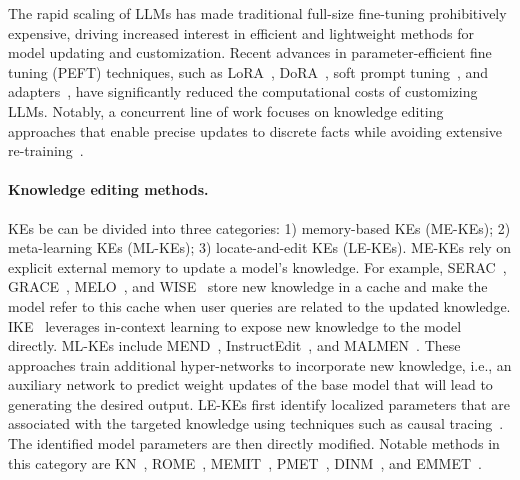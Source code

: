 

The rapid scaling of LLMs has made traditional full-size fine-tuning prohibitively expensive, driving increased interest in efficient and lightweight methods for model updating and customization. Recent advances in parameter-efficient fine tuning (PEFT) techniques, such as LoRA~\cite{hu2022lora}, DoRA~\cite{liudora}, soft prompt tuning~\cite{lester-etal-2021-power,razdaibiedina-etal-2023-residual}, and adapters~\cite{pmlr-v97-houlsby19a}, have significantly reduced the computational costs of customizing LLMs. Notably, a concurrent line of work focuses on knowledge editing approaches that enable precise updates to discrete facts while avoiding extensive re-training~\citep{zhang2024comprehensive}.

\paragraph{Knowledge editing methods.} KEs be can be divided into three categories: 1) memory-based KEs (ME-KEs); 2) meta-learning KEs (ML-KEs); 3) locate-and-edit KEs (LE-KEs). ME-KEs rely on explicit external memory to update a model's knowledge. For example, SERAC~\cite{mitchell2022memory}, GRACE~\cite{Hartvigsen2022AgingWG}, MELO~\cite{yu2023melo}, and WISE~\cite{wang2024wise} store new knowledge in a cache and make the model refer to this cache when user queries are related to the updated knowledge. IKE~\cite{zheng-etal-2023-edit} leverages in-context learning to expose new knowledge to the model directly.
ML-KEs include MEND~\cite{mitchell2022fast}, InstructEdit~\cite{ijcai2024p0733}, and MALMEN~\cite{tan23malmen}. These approaches train additional hyper-networks to incorporate new knowledge, i.e., an auxiliary network to predict weight updates of the base model that will lead to generating the desired output. 
LE-KEs first identify localized parameters that are associated with the targeted knowledge using techniques such as causal tracing~\cite{vig2020investigating,meng2022locating}. The  identified model parameters are then directly modified. Notable methods in this category are KN~\cite{dai-etal-2022-knowledge}, ROME~\cite{meng-etal-2022-locating}, MEMIT~\cite{meng-etal-2022-memit}, PMET~\cite{Li2023PMETPM}, DINM~\cite{wang-etal-2024-detoxifying}, and EMMET~\cite{gupta-etal-2024-unified}. 









